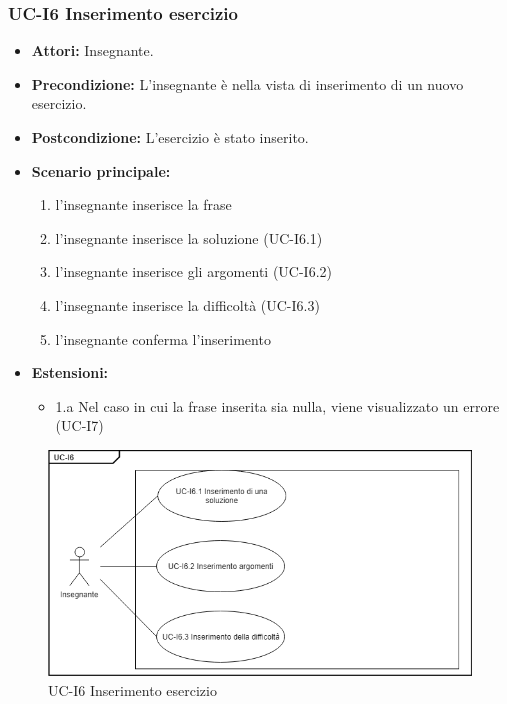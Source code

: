 \subsubsection{UC-I6 Inserimento esercizio}
	\begin{itemize}
		\item \textbf{Attori: }Insegnante.
		\item \textbf{Precondizione: }L'insegnante è nella vista di inserimento di un nuovo esercizio.
		\item \textbf{Postcondizione: }L'esercizio è stato inserito.
		\item \textbf{Scenario principale: }
			\begin{enumerate} 
				\item l'insegnante inserisce la frase
				\item l'insegnante inserisce la soluzione (UC-I6.1)
				\item l'insegnante inserisce gli argomenti (UC-I6.2)
				\item l'insegnante inserisce la difficoltà (UC-I6.3)
				\item l'insegnante conferma l'inserimento
			\end{enumerate}
		\item \textbf{Estensioni:} 
			\begin{itemize}
				\item 1.a Nel caso in cui la frase inserita sia nulla, viene visualizzato un errore (UC-I7)
			\end{itemize}
	\end{itemize}
	\begin{figure}[h]
		\centering
		\includegraphics[scale=0.7]{images/UC-I6.png}
		\caption{UC-I6 Inserimento esercizio}
	\end{figure}

